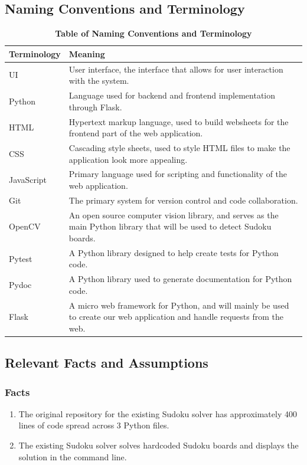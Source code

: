 \documentclass[11pt]{article}
\begin{document}
\subsection{Naming Conventions and Terminology}
\begin{table}[H]
\caption{\bf Table of Naming Conventions and Terminology}
\centering
\begin{tabularx}{\textwidth}{p{3cm}X}
\toprule
Terminology     & Meaning \\
\midrule
UI     & User interface, the interface that allows for user interaction with the system. \\
Python & Language used for backend and frontend implementation through Flask.\\
HTML & Hypertext markup language, used to build websheets for the frontend part of the web application.\\
CSS & Cascading style sheets, used to style HTML files to make the application look more appealing.\\
JavaScript & Primary language used for scripting and functionality of the web application. \\
Git & The primary system for version control and code collaboration.\\
OpenCV & An open source computer vision library, and serves as the main Python library that will be used to detect Sudoku boards. \\
Pytest & A Python library designed to help create tests for Python code. \\
Pydoc & A Python library used to generate documentation for Python code. \\
Flask & A micro web framework for Python, and will mainly be used to create our web application and handle requests from the web.\\
\bottomrule
\end{tabularx}
\end{table}
\subsection{Relevant Facts and Assumptions}

\subsubsection{Facts}

\begin{enumerate}
    \item The original repository for the existing Sudoku solver has approximately 400 lines of code spread across 3 Python files.
    \item The existing Sudoku solver solves hardcoded Sudoku boards and displays the solution in the command line.
\end{enumerate}
\end{document}
